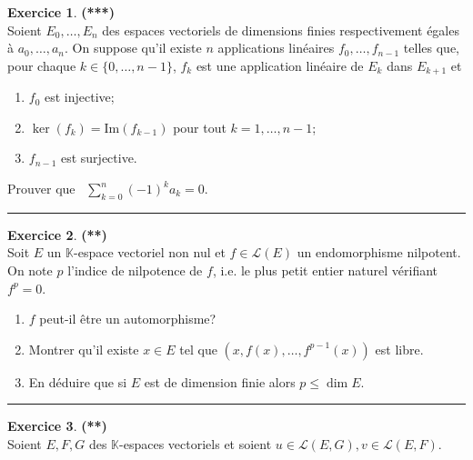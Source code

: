 \documentclass[a4paper,11pt]{article}
\theoremstyle{definition}
\newtheorem{exo}{Exercice} %
\begin{document}
\begin{minipage}{1\linewidth}\begin{minipage}[t]{0.48\linewidth}\raggedright
		
		\begin{exo}\textbf{(***)}\quad\\[0.2cm]
		Soient $E_0,\dots,E_n$ des espaces vectoriels de dimensions finies respectivement égales à $a_0,\dots,a_n$. 
		On suppose qu'il existe $n$ applications linéaires $f_0,\dots,f_{n-1}$ telles que, pour chaque $k\in\{0,\dots,n-1\}$,
		$f_k$ est une application linéaire de $E_k$ dans $E_{k+1}$ et 
		\begin{enumerate}
			\item $f_0$ est injective;
			\item $\ker(f_k)=\textrm{Im}(f_{k-1})$ pour tout $k=1,\dots,n-1$;
			\item $f_{n-1}$ est surjective.
		\end{enumerate}
		Prouver que  \ $\sum\limits_{k=0}^n (-1)^k a_k=0$.
		
				
		\centering\rule{1\linewidth}{0.6pt}\end{exo}
		
		
		
	
		
		
		\begin{exo}\textbf{(**)}\quad\\[0.2cm]
		
		Soit $E$ un $\mathbb{K}$-espace vectoriel non nul et $f \in \mathcal{L}(E)$ un endomorphisme nilpotent. On note $p$ l'indice de nilpotence de $f$, i.e. le plus petit entier naturel vérifiant $f^{p}=0$.
		
		\begin{enumerate}
		\item $f$ peut-il être un automorphisme?
		\item Montrer qu'il existe $x \in E$ tel que $\left(x, f(x), \ldots, f^{p-1}(x)\right)$ est libre.
		\item En déduire que si $E$ est de dimension finie alors $p \leq \operatorname{dim} E$.
		\end{enumerate}
			
		\centering\rule{1\linewidth}{0.6pt}\end{exo}
		
		
		\begin{exo}\textbf{(**)}\quad\\[0.2cm]
		
		
		Soient $E, F, G$ des $\mathbb{K}$-espaces vectoriels et soient $u \in \mathcal{L}(E, G), v \in \mathcal{L}(E, F)$.
		

\end{exo}
\end{minipage}
\end{minipage}
\end{document}
